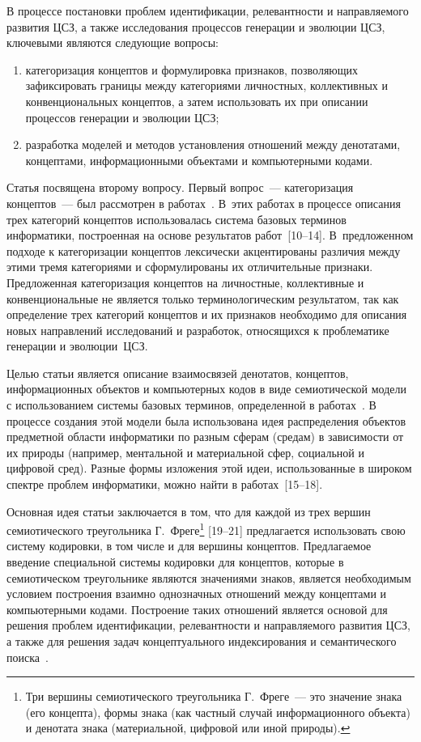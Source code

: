 \begin{multicols}{2}
   В процессе постановки проблем идентификации, релевантности и направляемого 
развития ЦСЗ, а также исследования процессов генерации и эволюции ЦСЗ, ключевыми 
являются следующие вопросы:
\begin{enumerate}[(1)]
\item категоризация концептов и формулировка признаков, позволяющих 
зафиксировать границы между категориями личностных, коллективных и 
конвенциональных концептов, а затем использовать их при описании процессов 
генерации и эволюции ЦСЗ;
\item разработка моделей и методов установления отношений между денотатами, 
концептами, информационными объектами и компьютерными кодами.
\end{enumerate}

   Статья посвящена второму вопросу. Первый вопрос~--- категоризация концептов~--- был 
рассмотрен в работах~\cite{8zat, 9zat}. В~этих работах в процессе описания трех 
категорий концептов использовалась система базовых терминов информатики, построенная 
на основе результатов работ~[10--14]. В~предложенном подходе к 
категоризации концептов лек\-си\-чески акцентированы различия между этими тремя 
категориями и сформулированы их отличительные признаки. Предложенная категоризация 
концептов на личностные, коллективные и конвенциональные не является только 
терминологическим результатом, так как определение трех категорий концептов и их 
признаков необходимо для описания новых направлений исследований и разработок, 
относящихся к проблематике генерации и эволюции~ЦСЗ.
{

}
   
   Целью статьи является описание взаимосвязей денотатов, концептов, информационных 
объектов и компьютерных кодов в виде семиотической модели с использованием системы 
базовых терминов, определенной в работах~\cite{8zat, 9zat}. В процессе создания этой 
модели была использована идея распределения объектов предметной области информатики 
по разным сферам (средам) в зависимости от их природы (например, ментальной и 
материальной сфер, социальной и цифровой сред). Разные формы изложения этой идеи, 
использованные в широком спектре проблем информатики, можно найти в работах~[15--18].
   
   Основная идея статьи заключается в том, что для каждой из трех вершин семиотического 
треугольника Г.~Фреге\footnote{Три вершины семиотического треугольника Г.~Фреге~--- это значение 
знака (его концепта), формы знака (как частный случай информационного объекта) и денотата знака 
(материальной, цифровой или иной природы).} [19--21] предлагается 
использовать свою систему кодировки, в том числе и для вершины концептов. Предлагаемое 
введение специальной системы кодировки для концептов, которые в семиотическом 
треугольнике являются значениями знаков, является необходимым условием по\-стро\-ения 
взаимно однозначных отношений между концептами и компьютерными кодами. Построение 
таких отношений является основой для решения проблем идентификации, релевантности и 
на\-прав\-ля\-емо\-го развития ЦСЗ, а также для решения задач концептуального индексирования и 
семантического поиска~\cite{17zat, 22zat}.
   

\end{multicols}
